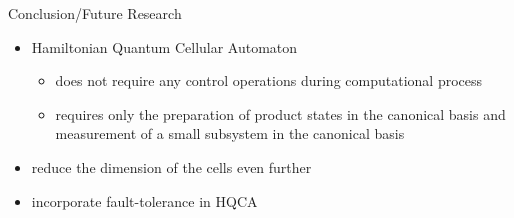 \documentclass[slideColor]{prosper}
\renewcommand{\>}{\rangle}
\newcommand{\<}{\langle}
\begin{document}

\begin{slide}{Conclusion/Future Research}

\begin{itemize}
\item Hamiltonian Quantum Cellular Automaton
\begin{itemize}

\medskip
\item does not require any control operations during computational process

\medskip
\item requires only the preparation of product states in the canonical basis and measurement of a small subsystem in the canonical basis
\end{itemize}

\medskip
\item reduce the dimension of the cells even further

\medskip
\item incorporate fault-tolerance in HQCA
\end{itemize}

\end{slide}

\end{document}
